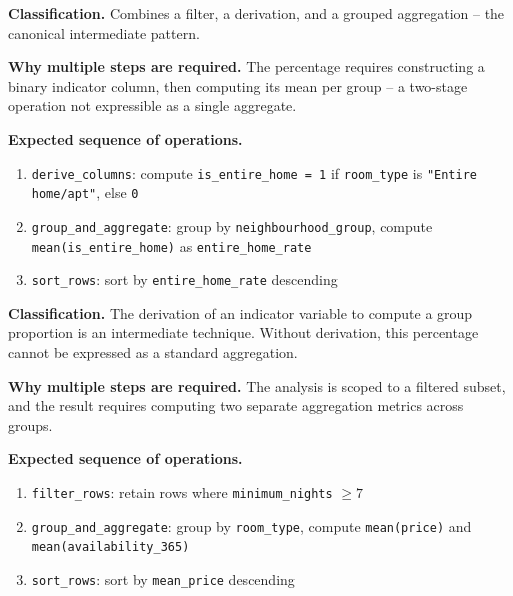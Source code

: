 \textbf{Classification.}
Combines a filter, a derivation, and a grouped aggregation -- the canonical intermediate pattern.



\textbf{Why multiple steps are required.}
The percentage requires constructing a binary indicator column, then computing its mean per group -- a two-stage operation not expressible as a single aggregate.

\textbf{Expected sequence of operations.}
\begin{enumerate}
  \item \texttt{derive\_columns}: compute \texttt{is\_entire\_home = 1} if
    \texttt{room\_type} is \texttt{"Entire home/apt"}, else \texttt{0}
  \item \texttt{group\_and\_aggregate}: group by \texttt{neighbourhood\_group},
    compute \texttt{mean(is\_entire\_home)} as \texttt{entire\_home\_rate}
  \item \texttt{sort\_rows}: sort by \texttt{entire\_home\_rate} descending
\end{enumerate}

\textbf{Classification.}
The derivation of an indicator variable to compute a group proportion is an intermediate technique. Without derivation, this percentage cannot be expressed as a standard aggregation.



\textbf{Why multiple steps are required.}
The analysis is scoped to a filtered subset, and the result requires computing two separate aggregation metrics across groups.

\textbf{Expected sequence of operations.}
\begin{enumerate}
  \item \texttt{filter\_rows}: retain rows where \texttt{minimum\_nights} $\geq 7$
  \item \texttt{group\_and\_aggregate}: group by \texttt{room\_type}, compute
    \texttt{mean(price)} and \texttt{mean(availability\_365)}
  \item \texttt{sort\_rows}: sort by \texttt{mean\_price} descending
\end{enumerate}

